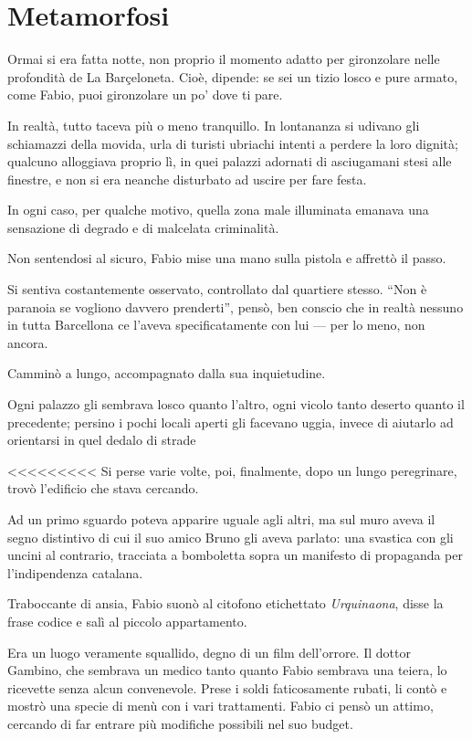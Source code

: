 \chapter{Metamorfosi}

Ormai si era fatta notte, non proprio il momento adatto per gironzolare nelle profondità de La Barçeloneta. Cioè, dipende: se sei un tizio losco e pure armato, come Fabio, puoi gironzolare un po' dove ti pare.

In realtà, tutto taceva più o meno tranquillo. In lontananza si udivano gli schiamazzi della movida, urla di turisti ubriachi intenti a perdere la loro dignità; qualcuno alloggiava proprio lì, in quei palazzi adornati di asciugamani stesi alle finestre, e non si era neanche disturbato ad uscire per fare festa.

In ogni caso, per qualche motivo, quella zona male illuminata emanava una sensazione di degrado e di malcelata criminalità.

Non sentendosi al sicuro, Fabio mise una mano sulla pistola e affrettò il passo. 

Si sentiva costantemente osservato, controllato dal quartiere stesso. ``Non è paranoia se vogliono davvero prenderti'', pensò, ben conscio che in realtà nessuno in tutta Barcellona ce l'aveva specificatamente con lui --- per lo meno, non ancora.

Camminò a lungo, accompagnato dalla sua inquietudine.

Ogni palazzo gli sembrava losco quanto l'altro, ogni vicolo tanto deserto quanto il precedente; persino i pochi locali aperti gli facevano uggia, invece di aiutarlo ad orientarsi in quel dedalo di strade 



<<<<<<<<<
Si perse varie volte, poi, finalmente, dopo un lungo peregrinare, trovò l'edificio che stava cercando. 

Ad un primo sguardo poteva apparire uguale agli altri, ma sul muro aveva il segno distintivo di cui il suo amico Bruno gli aveva parlato: una svastica con gli uncini al contrario, tracciata a bomboletta sopra un manifesto di propaganda per l'indipendenza catalana. 

Traboccante di ansia, Fabio suonò al citofono etichettato \textit{Urquinaona}, disse la frase codice e salì al piccolo appartamento.

Era un luogo veramente squallido, degno di un film dell'orrore. Il dottor Gambino, che sembrava un medico tanto quanto Fabio sembrava una teiera, lo ricevette senza alcun convenevole. Prese i soldi faticosamente rubati, li contò e mostrò una specie di menù con i vari trattamenti. Fabio ci pensò un attimo, cercando di far entrare più modifiche possibili nel suo budget.

